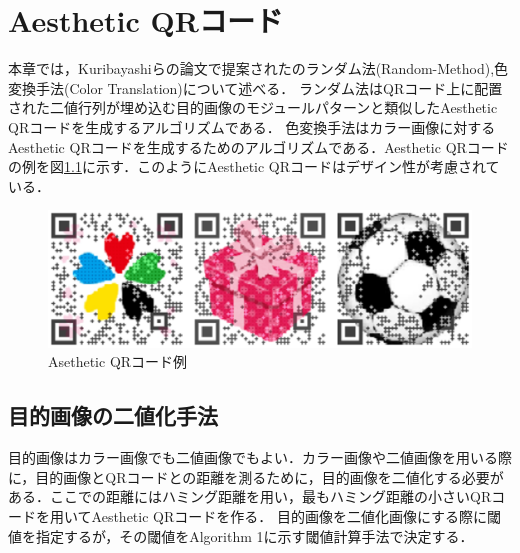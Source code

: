 \documentclass{thesis}
\begin{document}

\chapter{Aesthetic QRコード}
\label{chap:3}


本章では，Kuribayashiらの論文で提案された\cite{KURI}のランダム法(Random-Method),色変換手法(Color Translation)について述べる．
ランダム法はQRコード上に配置された二値行列が埋め込む目的画像のモジュールパターンと類似したAesthetic QRコードを生成するアルゴリズムである．
色変換手法はカラー画像に対するAesthetic QRコードを生成するためのアルゴリズムである．Aesthetic QRコードの例を図\ref{As}に示す．このようにAesthetic QRコードはデザイン性が考慮されている．

\begin{figure}[H]
      \centering
      \includegraphics[width=0.7\linewidth]{pic/AestheticQRcode_ex.eps}
      \caption{Asethetic QRコード例\cite{KURI}}
      \label{As}
\end{figure}



\section{目的画像の二値化手法}


目的画像はカラー画像でも二値画像でもよい．カラー画像や二値画像を用いる際に，目的画像とQRコードとの距離を測るために，目的画像を二値化する必要がある．ここでの距離にはハミング距離を用い，最もハミング距離の小さいQRコードを用いてAesthetic QRコードを作る．
目的画像を二値化画像にする際に閾値を指定するが，その閾値をAlgorithm 1に示す閾値計算手法で決定する．
\end{document}
